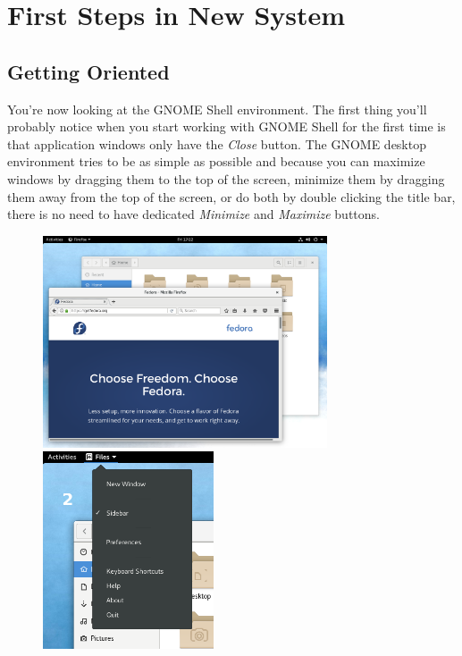 \chapter*{First Steps in New System}
\section*{Getting Oriented}

You're now looking at the GNOME Shell environment. The first thing you'll probably notice when you start working with GNOME Shell for the first time is that application windows only have the \emph{Close} button. The GNOME desktop environment tries to be as simple as possible and because you can maximize windows by dragging them to the top of the screen, minimize them by dragging them away from the top of the screen, or do both by double clicking the title bar, there is no need to have dedicated \emph{Minimize} and \emph{Maximize} buttons.

\begin{figure}[p]
\begin{center}
\includegraphics[width=0.75\textwidth]{img/shell-a}
 \label{fig:shell-a}
\bigskip
\includegraphics[width=0.45\textwidth]{img/app-menu}
 \label{fig:app-menu}
\end{center}
\end{figure}


